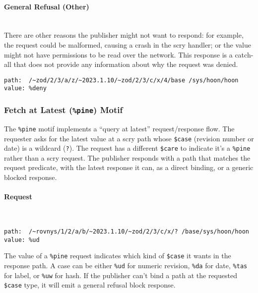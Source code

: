\documentclass[twoside]{article}
\begin{document}
\paragraph{General Refusal (Other)} \mbox{}\\

There are other reasons the publisher might not want to respond: for example, the request could be malformed, causing a crash in the scry handler; or the value might not have permissions to be read over the network. This response is a catch-all that does not provide any information about why the request was denied.

\begin{lstlisting}[style=listingcode]
path:  /~zod/2/3/a/z/~2023.1.10/~zod/2/3/c/x/4/base /sys/hoon/hoon
value: %deny
\end{lstlisting}

\subsubsection{Fetch at Latest (\texttt{\%pine}) Motif}

The \lstinline[style=inlinecode]{%pine} motif implements a ``query at latest'' request/response flow. The requester asks for the latest value at a scry path whose \lstinline[style=inlinecode]{$case} (revision number or date) is a wildcard (\lstinline[style=inlinecode]{?}). The request has a different \lstinline[style=inlinecode]{$care} to indicate it's a \lstinline[style=inlinecode]{%pine} rather than a scry request. The publisher responds with a path that matches the request predicate, with the latest response it can, as a direct binding, or a generic blocked response.

\paragraph{Request} \mbox{}\\

\begin{lstlisting}[style=listingcode]
path:  /~rovnys/1/2/a/b/~2023.1.10/~zod/2/3/c/x/? /base/sys/hoon/hoon
value: %ud
\end{lstlisting}

The value of a \lstinline[style=inlinecode]{%pine} request indicates which kind of \lstinline[style=inlinecode]{$case} it wants in the response path. A case can be either \lstinline[style=inlinecode]{%ud} for numeric revision, \lstinline[style=inlinecode]{%da} for date, \lstinline[style=inlinecode]{%tas} for label, or \lstinline[style=inlinecode]{%uw} for hash. If the publisher can't bind a path at the requested \lstinline[style=inlinecode]{$case} type, it will emit a general refusal block response.
\end{document}
